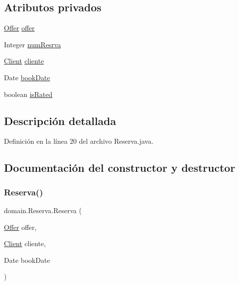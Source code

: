 \subsection*{Atributos privados}
\begin{DoxyCompactItemize}
\item 
\mbox{\hyperlink{classdomain_1_1_offer}{Offer}} \mbox{\hyperlink{classdomain_1_1_reserva_a94a6ee6bd5c3aea150f3977c8a7cf1f0}{offer}}
\item 
Integer \mbox{\hyperlink{classdomain_1_1_reserva_a27d9c46e38154c94ce6095a9bd60bbd3}{num\+Resrva}}
\item 
\mbox{\hyperlink{classdomain_1_1_client}{Client}} \mbox{\hyperlink{classdomain_1_1_reserva_a2e519e6a41cf08679b9c9f6a4540a454}{cliente}}
\item 
Date \mbox{\hyperlink{classdomain_1_1_reserva_a6a00db7ede45d4548224d99d8f42256b}{book\+Date}}
\item 
boolean \mbox{\hyperlink{classdomain_1_1_reserva_ad4ad501d339fb6accca9de2122201d04}{is\+Rated}}
\end{DoxyCompactItemize}


\subsection{Descripción detallada}


Definición en la línea 20 del archivo Reserva.\+java.



\subsection{Documentación del constructor y destructor}
\mbox{\label{classdomain_1_1_reserva_acb289875e54f0b223b7ab92c47e3ea86}} 
\subsubsection{\texorpdfstring{Reserva()}{Reserva()}\hspace{0.1cm}{\footnotesize\ttfamily [1/2]}}
{\footnotesize\ttfamily domain.\+Reserva.\+Reserva (\begin{DoxyParamCaption}\item[{\mbox{\hyperlink{classdomain_1_1_offer}{Offer}}}]{offer,  }\item[{\mbox{\hyperlink{classdomain_1_1_client}{Client}}}]{cliente,  }\item[{Date}]{book\+Date }\end{DoxyParamCaption})}



